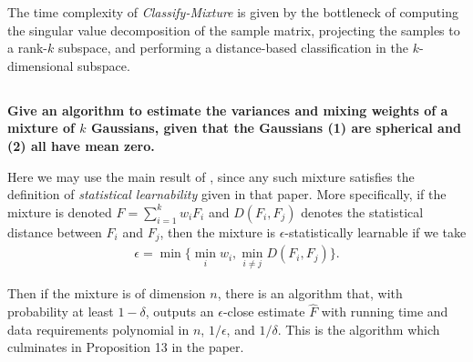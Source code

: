 \documentclass[a4paper,12pt]{article}
\theoremstyle{remark}
\begin{document}
    The time complexity of \emph{Classify-Mixture} is given by the bottleneck of computing the singular value decomposition of the sample matrix, projecting the samples to a rank-$k$ subspace, and performing a distance-based classification in the $k$-dimensional subspace.

\subsection{}
    \boldmath\textbf{Give an algorithm to estimate the variances and mixing weights of a mixture of $k$ Gaussians, given that the Gaussians (1) are spherical and (2) all have mean zero.
    }\unboldmath \par
    Here we may use the main result of \cite{mixture}, since any such mixture satisfies the definition of \emph{statistical learnability} given in that paper. More specifically, if the mixture is denoted $F = \sum_{i = 1}^k w_i F_i$ and $D(F_i, F_j)$ denotes the statistical distance between $F_i$ and $F_j$, then the mixture is $\epsilon$-statistically learnable if we take
    \begin{align*}
        \epsilon = \min\{ \min_i w_i, \min_{i \neq j} D(F_i, F_j) \}.
    \end{align*} \par
    Then if the mixture is of dimension $n$, there is an algorithm that, with probability at least $1 - \delta$, outputs an $\epsilon$-close estimate $\hat{F}$ with running time and data requirements polynomial in $n$, $1/\epsilon$, and $1/\delta$. This is the algorithm which culminates in Proposition 13 in the paper.
\end{document}
